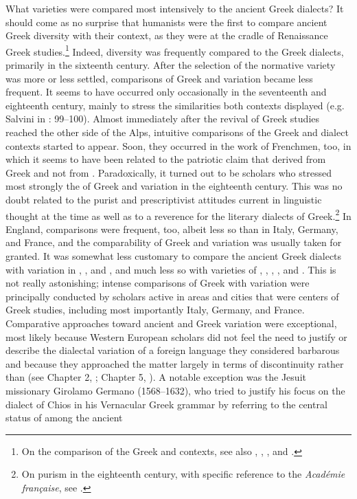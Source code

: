 What  varieties were compared most intensively to the ancient Greek dialects? It should come as no surprise that  humanists were the first to compare ancient Greek diversity with their  context, as they were at the cradle of Renaissance Greek studies.\footnote{On the comparison of the Greek and  contexts, see also \citet[2–3, 51]{Dionisotti1968}, \citet[179]{Alinei1984}, \citet[215]{Trovato1984}, and \citet[36--37]{Lepschy2002}.} Indeed,  diversity was frequently compared to the Greek dialects, primarily in the sixteenth century. After the selection of the normative variety was more or less settled, comparisons of Greek and  variation became less frequent. It seems to have occurred only occasionally in the seventeenth and eighteenth century, mainly to stress the similarities both contexts displayed (e.g. Salvini in \citealt{Muratori1724}: 99–100). Almost immediately after the revival of Greek studies reached the other side of the Alps, intuitive comparisons of the Greek and  dialect contexts started to appear. Soon, they occurred in the work of Frenchmen, too, in which it seems to have been related to the patriotic claim that  derived from Greek and not from . Paradoxically, it turned out to be  scholars who stressed most strongly the  of Greek and  variation in the eighteenth century. This was no doubt related to the purist and prescriptivist attitudes current in  linguistic thought at the time as well as to a reverence for the literary dialects of Greek.\footnote{On  purism in the eighteenth century, with specific reference to the \textit{Académie française}, see \citet[]{Francois1905}.} In England, comparisons were frequent, too, albeit less so than in Italy, Germany, and France, and the comparability of Greek and  variation was usually taken for granted. It was somewhat less customary to compare the ancient Greek dialects with variation in , , and , and much less so with varieties of , , , , and . This is not really astonishing; intense comparisons of Greek with  variation were principally conducted by scholars active in areas and cities that were centers of Greek studies, including most importantly Italy, Germany, and France. Comparative approaches toward ancient and  Greek variation were exceptional, most likely because Western European scholars did not feel the need to justify or describe the dialectal variation of a foreign language they considered barbarous and because they approached the matter largely in terms of discontinuity rather than  (see Chapter 2, ; Chapter 5, ). A notable exception was the  Jesuit missionary Girolamo Germano (1568–1632), who tried to justify his focus on the dialect of Chios in his Vernacular Greek grammar by referring to the central status of  among the ancient 